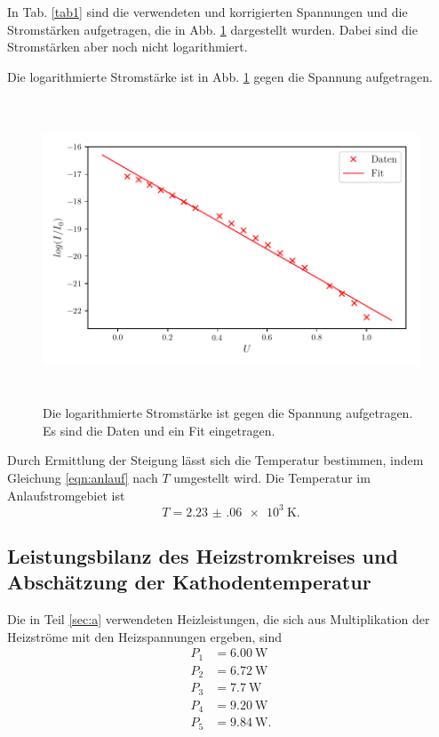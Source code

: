 



In Tab. \ref{tab1} sind die verwendeten und korrigierten Spannungen und die Stromstärken aufgetragen, die in Abb. \ref{fig:plot3}
dargestellt wurden. Dabei sind die Stromstärken aber noch nicht logarithmiert. 



\noindent Die logarithmierte Stromstärke ist in Abb. \ref{fig:plot3}
gegen die Spannung aufgetragen.
\begin{figure}
    \centering
    \includegraphics[width=15cm, height=9cm]{build/plot3.pdf}
    \caption{Die logarithmierte Stromstärke ist gegen die Spannung aufgetragen.
    Es sind die Daten und ein Fit eingetragen.}
    \label{fig:plot3}
\end{figure}

\noindent Durch Ermittlung der Steigung lässt sich
die Temperatur bestimmen, indem Gleichung \eqref{eqn:anlauf}
nach $T$ umgestellt wird. 
Die Temperatur im Anlaufstromgebiet ist
\begin{equation*}
    T = \SI{2.23(06)e3}{\kelvin}.
\end{equation*}


\subsection{Leistungsbilanz des Heizstromkreises und Abschätzung der Kathodentemperatur}
Die in Teil \ref{sec:a} verwendeten Heizleistungen, die sich 
aus Multiplikation der Heizströme mit den Heizspannungen
ergeben, sind
\begin{align*}
    P_\text{1} &= \SI{6.00}{\watt} \\
    P_\text{2} &= \SI{6.72}{\watt} \\
    P_\text{3} &= \SI{7.7}{\watt} \\
    P_\text{4} &= \SI{9.20}{\watt} \\
    P_\text{5} &= \SI{9.84}{\watt}.
\end{align*}  %

